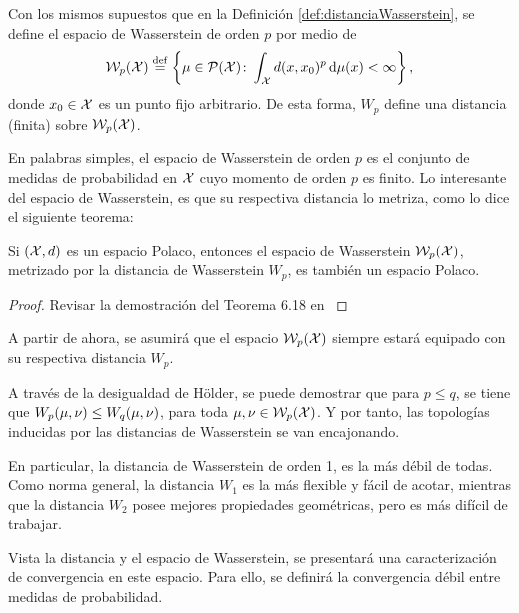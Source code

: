 {{	  \begin{definition}
		  Con los mismos supuestos que en la Definición \ref{def:distanciaWasserstein}, se define el espacio de Wasserstein de orden $p$ por medio de
		  \begin{equation}
			  \WassersteinSpace[p]{\cX} \eqdef \left\{
			  \mu \in \ProbSpace[\cX] \colon \int_{\cX} d(x, x_0)^{p} \dmu[x] < \infty
			  \right\},
		  \end{equation}
		  donde $x_0 \in \cX$ es un punto fijo arbitrario. De esta forma, $W_p$ define una distancia (finita) sobre $\WassersteinSpace[p]{\cX}$.
	  \end{definition}
	  En palabras simples, el espacio de Wasserstein de orden $p$ es el conjunto de medidas de probabilidad en $\cX$ cuyo momento de orden $p$ es finito. Lo interesante del espacio de Wasserstein, es que su respectiva distancia lo metriza, como lo dice el siguiente teorema:
	  \begin{theorem}\label{thm:espacioWassersteinEsMetrico}
		  Si $(\cX, d)$ es un espacio Polaco, entonces el espacio de Wasserstein $\WassersteinSpace[p]{\cX} $, metrizado por la distancia de Wasserstein $W_p$, es también un espacio Polaco.
	  \end{theorem}

	  \begin{proof}
		  Revisar la demostración del Teorema 6.18 en \cite[p. 105]{villani2009optimal}
	  \end{proof}

	  A partir de ahora, se asumirá que el espacio $\WassersteinSpace[p]{\cX} $ siempre estará equipado con su respectiva distancia $W_p$.

	  \begin{remark}
		  A través de la desigualdad de Hölder, se puede demostrar que para $p \leq q$, se tiene que $\Wasserstein[p]{\mu}{\nu} \leq \Wasserstein[q]{\mu}{\nu}$, para toda $\mu, \nu \in \WassersteinSpace[p]{\cX}$. Y por tanto, las topologías inducidas por las distancias de Wasserstein se van encajonando.

		  En particular, la distancia de Wasserstein de orden 1, es la más débil de todas. Como norma general, la distancia $W_1$  es la más flexible y fácil de acotar, mientras que la distancia $W_2$ posee mejores propiedades geométricas, pero es más difícil de trabajar.
	  \end{remark}

	  Vista la distancia y el espacio de Wasserstein, se presentará una caracterización de convergencia en este espacio. Para ello, se definirá la convergencia débil entre medidas de probabilidad.

}}
